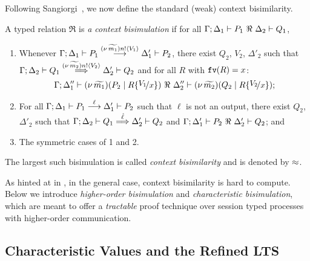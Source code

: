 Following Sangiorgi~\cite{San96H}, 
we now define the standard (weak) context bisimilarity. 
%
\begin{definition}
	\label{def:wbc}
	A typed relation $\Re$ is {\em a context bisimulation} if
	for all $\horel{\Gamma}{\Delta_1}{P_1}{\ \Re \ }{\Delta_2}{Q_1}$,
%
	\begin{enumerate}[1)] 
		\item
				Whenever 
				$\Gamma; \Delta_1 \vdash P_1 \stackrel{(\nu\, \widetilde{m_1}) n ! \langle V_1 \rangle}{\longrightarrow} \Delta_1' \vdash P_2$,
				there exist $Q_2$, $V_2$, $\Delta'_2$
				such that $\Gamma; \Delta_2 \vdash Q_1 \stackrel{(\nu\, \widetilde{m_2}) n ! \langle V_2 \rangle}{\Longrightarrow} \Delta_2' \vdash Q_2$ and 
				for all $R$ with $\mathtt{fv}(R)=x$:
%
			\[
				\horel{\Gamma}{\Delta_1''}{\newsp{\widetilde{m_1}}{P_2 \Par R\subst{V_1}{x}}}
				{\ \Re\ }
				{\Delta_2''}{\newsp{\widetilde{m_2}}{Q_2 \Par R\subst{V_2}{x}}};
			\]

		\item	
				For all $\Gamma; \Delta_1 \vdash P_1 \stackrel{\ell}{\longrightarrow} \Delta_1' \vdash P_2$ such that 
				$\ell$ is not an output, there exist $Q_2$, $\Delta'_2$ such that 
				$\Gamma; \Delta_2 \vdash Q_1 \stackrel{\hat{\ell}}{\Longrightarrow} \Delta_2' \vdash Q_2$
				and
				$\horel{\Gamma}{\Delta_1'}{P_2}{\ \Re \ }{\Delta_2'}{Q_2}$; and  

		\item
				The symmetric cases of 1 and 2.                
	\end{enumerate}
%
	The largest such bisimulation is called \emph{context bisimilarity} and is denoted by $\approx$.
\end{definition}

\noi As hinted at in
, in the general case,
context bisimilarity is hard to compute.
Below we introduce \emph{higher-order bisimulation} and \emph{characteristic bisimulation},
which are meant to offer a \emph{tractable} proof technique over session typed
processes with higher-order communication.

\subsection{Characteristic Values and the Refined LTS}
\label{ss:reflts}

